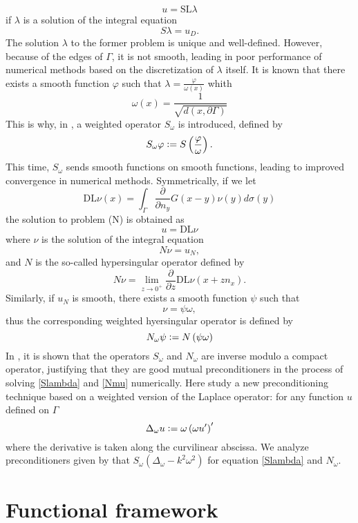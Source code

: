 \documentclass[]{article}
\begin{document}
\[ u = \text{SL} \lambda \]
if $\lambda$ is a solution of the integral equation 
\begin{equation}
	S \lambda = u_D.
	\label{Slambda}
\end{equation} 
The solution $\lambda$ to the former problem is unique and well-defined. However, because of the edges of $\Gamma$, it is not smooth, leading in poor performance of numerical methods based on the discretization of $\lambda$ itself. It is known that there exists a smooth function $\varphi$ such that $ \lambda = \frac{\varphi}{\omega(x)}$ whith 
\[\omega(x) = \dfrac{1}{\sqrt{d(x,\partial \Gamma)}}\]
This is why, in \cite{bruno2012second}, a weighted operator $S_{\omega}$ is introduced, defined by 
\[S_{\omega} \varphi \mathrel{\mathop:}= S \left(\dfrac{\varphi}{\omega}\right).\]
This time, $S_\omega$ sends smooth functions on smooth functions, leading to improved convergence in numerical methods. 
Symmetrically, if we let 
\begin{equation}
\text{DL}\nu(x) = \int_{\Gamma}\dfrac{\partial}{\partial n_y} G(x-y)\nu(y)d\sigma(y)
\end{equation}
the solution to problem (N) is obtained as 
\[u = \text{DL}\nu\] where $\nu$ is the solution of the integral equation
\begin{equation}
N \nu = u_N,
	\label{Nmu}
\end{equation}
and $N$ is the so-called hypersingular operator defined by 
\[N\nu = \lim_{z \to 0^+}\dfrac{\partial}{\partial z}\text{DL}\nu(x + z n_x).\]
Similarly, if $u_N$ is smooth, there exists a smooth function $\psi$ such that 
\[\nu = \psi\omega,\]
thus the corresponding weighted hyersingular operator is defined by 
\[N_{\omega}\psi \mathrel{\mathop:}= N\left(\psi \omega\right)\]
In \cite{bruno2012second}, it is shown that the operators $S_{\omega}$ and $N_{\omega}$ are inverse modulo a compact operator, justifying that they are good mutual preconditioners in the process of solving \eqref{Slambda} and \eqref{Nmu} numerically. 
Here study a new preconditioning technique based on a weighted version of the Laplace operator: for any function $u$ defined on $\Gamma$
\[\Delta_{\omega}u \mathrel{\mathop:}= \omega\left(\omega u'\right)'\]
where the derivative is taken along the curvilinear abscissa. We analyze preconditioners given by that $S_\omega (\Delta_\omega - k^2 \omega^2)$ for equation \eqref{Slambda} and $N_{\omega}$.

\section{Functional framework}
\end{document}
